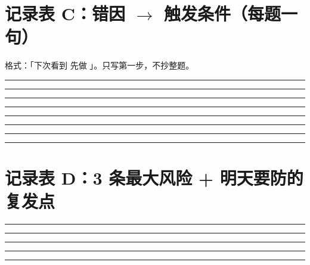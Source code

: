 \documentclass[10pt,a4paper]{ctexart}
\newcommand{\blank}{\underline{\hspace{1.5cm}}}
\begin{document}
\clearpage

\section*{记录表 C：错因 $\to$ 触发条件（每题一句）}
{\small 格式：「下次看到 \blank 先做 \blank」。只写第一步，不抄整题。}
\par\smallskip\noindent\rule{\linewidth}{0.25pt}\par\vspace{0.58cm}
\noindent\rule{\linewidth}{0.25pt}\par\vspace{0.58cm}
\noindent\rule{\linewidth}{0.25pt}\par\vspace{0.58cm}
\noindent\rule{\linewidth}{0.25pt}\par\vspace{0.58cm}
\noindent\rule{\linewidth}{0.25pt}\par\vspace{0.58cm}
\noindent\rule{\linewidth}{0.25pt}\par\vspace{0.58cm}
\noindent\rule{\linewidth}{0.25pt}\par\vspace{0.58cm}
\noindent\rule{\linewidth}{0.25pt}\par\vspace{0.58cm}
\section*{记录表 D：3 条最大风险 + 明天要防的复发点}
\par\smallskip\noindent\rule{\linewidth}{0.25pt}\par\vspace{0.58cm}
\noindent\rule{\linewidth}{0.25pt}\par\vspace{0.58cm}
\noindent\rule{\linewidth}{0.25pt}\par\vspace{0.58cm}
\noindent\rule{\linewidth}{0.25pt}\par\vspace{0.58cm}
\noindent\rule{\linewidth}{0.25pt}\par\vspace{0.58cm}
\end{document}
